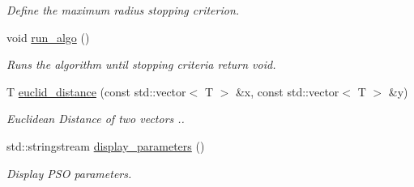 \begin{DoxyCompactItemize}
\begin{DoxyCompactList}\small\item\em Define the maximum radius stopping criterion. \end{DoxyCompactList}\item 
void \hyperlink{classea_1_1_solver_3_01_p_s_os_00_01_t_00_01_f_00_01_c_01_4_a4952777e6e95820c9702e9306e24d1fb}{run\+\_\+algo} ()
\begin{DoxyCompactList}\small\item\em Runs the algorithm until stopping criteria return void. \end{DoxyCompactList}\item 
T \hyperlink{classea_1_1_solver_3_01_p_s_os_00_01_t_00_01_f_00_01_c_01_4_abb67d82749ba9525e7c8c68f5494389f}{euclid\+\_\+distance} (const std\+::vector$<$ T $>$ \&x, const std\+::vector$<$ T $>$ \&y)
\begin{DoxyCompactList}\small\item\em Euclidean Distance of two vectors .. \end{DoxyCompactList}\item 
std\+::stringstream \hyperlink{classea_1_1_solver_3_01_p_s_os_00_01_t_00_01_f_00_01_c_01_4_afcb113cca952b4954e3639e538d6c5cd}{display\+\_\+parameters} ()
\begin{DoxyCompactList}\small\item\em Display P\+SO parameters. \end{DoxyCompactList}\end{DoxyCompactItemize}
